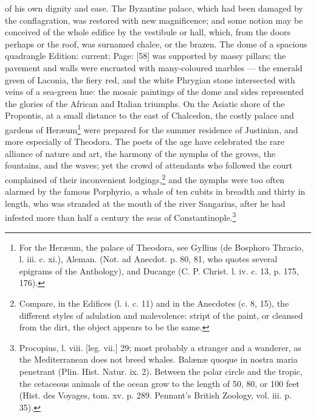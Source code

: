of his own dignity and ease. The Byzantine palace, which had been damaged by the conflagration, was restored with new magnificence; and some notion may be conceived of the whole edifice by the vestibule or hall, which, from the doors perhaps or the roof, was surnamed chalce, or the brazen. The dome of a spacious quadrangle Edition: current; Page: [58] was supported by massy pillars; the pavement and walls were encrusted with many-coloured marbles \texthebrew{—} the emerald green of Laconia, the fiery red, and the white Phrygian stone intersected with veins of a sea-green hue: the mosaic paintings of the dome and sides represented the glories of the African and Italian triumphs. On the Asiatic shore of the Propontis, at a small distance to the east of Chalcedon, the costly palace and gardens of Heræum\footnote{For the Heræum, the palace of Theodora, see Gyllius (de Bosphoro Thracio, l. iii. c. xi.), Aleman. (Not. ad Anecdot. p. 80, 81, who quotes several epigrams of the Anthology), and Ducange (C. P. Christ. l. iv. c. 13, p. 175, 176).} were prepared for the summer residence of Justinian, and more especially of Theodora. The poets of the age have celebrated the rare alliance of nature and art, the harmony of the nymphs of the groves, the fountains, and the waves; yet the crowd of attendants who followed the court complained of their inconvenient lodgings,\footnote{Compare, in the Edifices (l. i. c. 11) and in the Anecdotes (c. 8, 15), the different styles of adulation and malevolence: stript of the paint, or cleansed from the dirt, the object appears to be the same.} and the nymphs were too often alarmed by the famous Porphyrio, a whale of ten cubits in breadth and thirty in length, who was stranded at the mouth of the river Sangarius, after he had infested more than half a century the seas of Constantinople.\footnote{Procopius, l. viii. [leg. vii.] 29; most probably a stranger and a wanderer, as the Mediterranean does not breed whales. Balænæ quoque in nostra maria penetrant (Plin. Hist. Natur. ix. 2). Between the polar circle and the tropic, the cetaceous animals of the ocean grow to the length of 50, 80, or 100 feet (Hist. des Voyages, tom. xv. p. 289. Pennant\texthebrew{}’s British Zoology, vol. iii. p. 35).}

